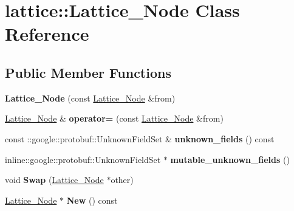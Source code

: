 \hypertarget{classlattice_1_1Lattice__Node}{
\section{lattice::Lattice\_\-Node Class Reference}
\label{classlattice_1_1Lattice__Node}
}
\subsection*{Public Member Functions}
\begin{DoxyCompactItemize}
\item 
\hypertarget{classlattice_1_1Lattice__Node_a147424c31f0775202a79ceab4fa2fe8d}{
{\bfseries Lattice\_\-Node} (const \hyperlink{classlattice_1_1Lattice__Node}{Lattice\_\-Node} \&from)}
\label{classlattice_1_1Lattice__Node_a147424c31f0775202a79ceab4fa2fe8d}

\item 
\hypertarget{classlattice_1_1Lattice__Node_a27f953898aafca2d9fbd2622c4eeabbd}{
\hyperlink{classlattice_1_1Lattice__Node}{Lattice\_\-Node} \& {\bfseries operator=} (const \hyperlink{classlattice_1_1Lattice__Node}{Lattice\_\-Node} \&from)}
\label{classlattice_1_1Lattice__Node_a27f953898aafca2d9fbd2622c4eeabbd}

\item 
\hypertarget{classlattice_1_1Lattice__Node_a2f70b3b935aef09e0aee93a1e8a15561}{
const ::google::protobuf::UnknownFieldSet \& {\bfseries unknown\_\-fields} () const }
\label{classlattice_1_1Lattice__Node_a2f70b3b935aef09e0aee93a1e8a15561}

\item 
\hypertarget{classlattice_1_1Lattice__Node_a5c846fa08d1f88c39655400947f1c3cc}{
inline::google::protobuf::UnknownFieldSet $\ast$ {\bfseries mutable\_\-unknown\_\-fields} ()}
\label{classlattice_1_1Lattice__Node_a5c846fa08d1f88c39655400947f1c3cc}

\item 
\hypertarget{classlattice_1_1Lattice__Node_ab39220e03258bb1064634db1f021b0e3}{
void {\bfseries Swap} (\hyperlink{classlattice_1_1Lattice__Node}{Lattice\_\-Node} $\ast$other)}
\label{classlattice_1_1Lattice__Node_ab39220e03258bb1064634db1f021b0e3}

\item 
\hypertarget{classlattice_1_1Lattice__Node_a8c76bc3cfeef5b3e248f6a19906cce2e}{
\hyperlink{classlattice_1_1Lattice__Node}{Lattice\_\-Node} $\ast$ {\bfseries New} () const }
\label{classlattice_1_1Lattice__Node_a8c76bc3cfeef5b3e248f6a19906cce2e}


\end{DoxyCompactItemize}
